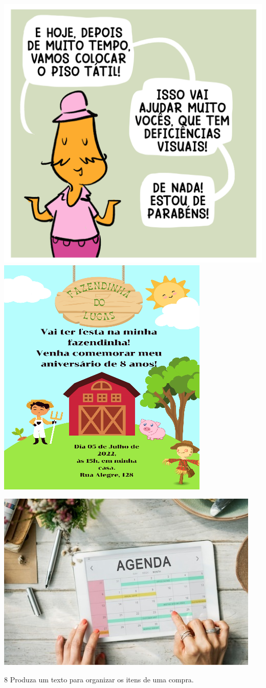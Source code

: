 \includegraphics[width=.5\textwidth]{media/image110.png}
\includegraphics[width=.5\textwidth]{media/image109.png}

\includegraphics[width=.5\textwidth]{media/image108.jpeg}


\num{8} Produza um texto para organizar os itens de uma compra.


